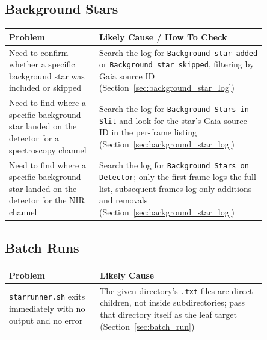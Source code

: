 \subsection{Background Stars}

\begin{center}
    \begin{tabular}{>{\raggedright\arraybackslash}p{0.30\linewidth} >{\raggedright\arraybackslash}p{0.55\linewidth}}
        \toprule
        \textbf{Problem}                                                                                & \textbf{Likely Cause / How To Check}                                                                                                                                                         \\
        \midrule
        Need to confirm whether a specific background star was included or skipped                      & Search the log for \texttt{Background star added} or \texttt{Background star skipped}, filtering by Gaia source ID (Section~\ref{sec:background_star_log})                                   \\
        \midrule
        Need to find where a specific background star landed on the detector for a spectroscopy channel & Search the log for \texttt{Background Stars in Slit} and look for the star's Gaia source ID in the per-frame listing (Section~\ref{sec:background_star_log})                                 \\
        \midrule
        Need to find where a specific background star landed on the detector for the NIR channel        & Search the log for \texttt{Background Stars on Detector}; only the first frame logs the full list, subsequent frames log only additions and removals (Section~\ref{sec:background_star_log}) \\
        \bottomrule
    \end{tabular}
\end{center}

\subsection{Batch Runs}

\begin{center}
    \begin{tabular}{p{0.30\linewidth} p{0.55\linewidth}}
        \toprule
        \textbf{Problem}                                                     & \textbf{Likely Cause}                                                                                                                                                 \\
        \midrule
        \texttt{starrunner.sh} exits immediately with no output and no error & The given directory's \texttt{.txt} files are direct children, not inside subdirectories; pass that directory itself as the leaf target (Section~\ref{sec:batch_run}) \\
        \bottomrule
    \end{tabular}
\end{center}

